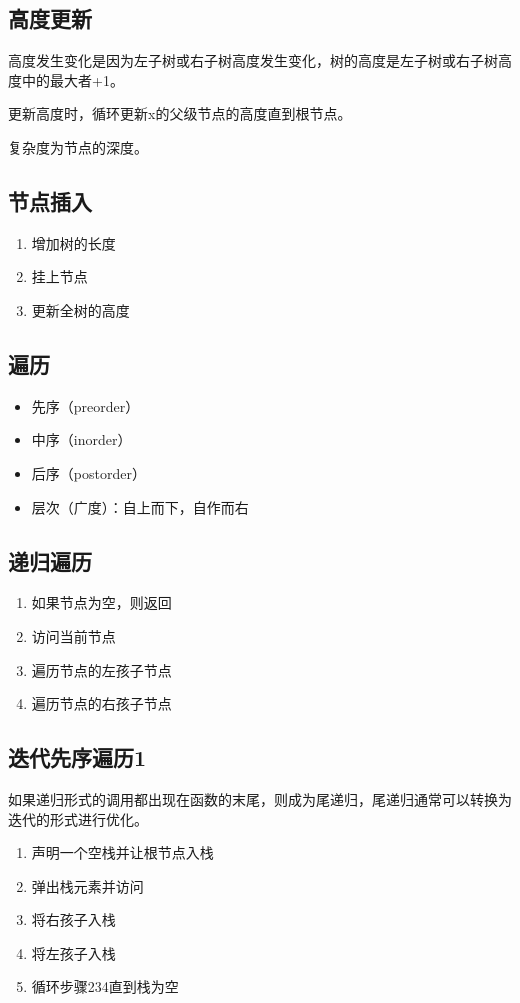 \documentclass{article}
\begin{document}
\subsection{高度更新}
高度发生变化是因为左子树或右子树高度发生变化，树的高度是左子树或右子树高度中的最大者+1。

更新高度时，循环更新x的父级节点的高度直到根节点。

复杂度为节点的深度。

\subsection{节点插入}

\begin{enumerate}
  \item 增加树的长度
  \item 挂上节点
  \item 更新全树的高度
\end{enumerate}

\subsection{遍历}

\begin{itemize}
  \item 先序（preorder）
  \item 中序（inorder）
  \item 后序（postorder）
  \item 层次（广度）：自上而下，自作而右
\end{itemize}

\subsection{递归遍历}
\begin{enumerate}
  \item 如果节点为空，则返回
  \item 访问当前节点
  \item 遍历节点的左孩子节点
  \item 遍历节点的右孩子节点
\end{enumerate}

\subsection{迭代先序遍历1}

如果递归形式的调用都出现在函数的末尾，则成为尾递归，尾递归通常可以转换为迭代的形式进行优化。
\begin{enumerate}
  \item 声明一个空栈并让根节点入栈
  \item 弹出栈元素并访问
  \item 将右孩子入栈
  \item 将左孩子入栈
  \item 循环步骤234直到栈为空
\end{enumerate}
\end{document}
